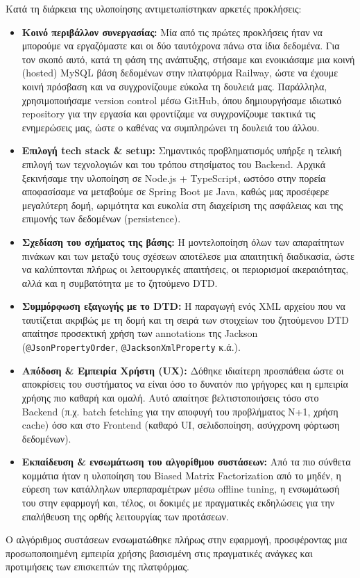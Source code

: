 \documentclass[12pt]{fphw}
\newcommand{\en}[1]{\foreignlanguage{english}{#1}}
\begin{document}
Κατά τη διάρκεια της υλοποίησης αντιμετωπίστηκαν αρκετές προκλήσεις:
\begin{itemize}[label=\textbullet]

\item \textbf{Κοινό περιβάλλον συνεργασίας:} Μία από τις πρώτες προκλήσεις ήταν να μπορούμε να εργαζόμαστε και οι δύο ταυτόχρονα πάνω στα ίδια δεδομένα. Για τον σκοπό αυτό, κατά τη φάση της ανάπτυξης, στήσαμε και ενοικιάσαμε μια κοινή (\en{hosted}) \en{MySQL} βάση δεδομένων στην πλατφόρμα \en{Railway}, ώστε να έχουμε κοινή πρόσβαση και να συγχρονίζουμε εύκολα τη δουλειά μας. Παράλληλα, χρησιμοποιήσαμε \en{version control} μέσω \en{GitHub}, όπου δημιουργήσαμε ιδιωτικό \en{repository} για την εργασία και φροντίζαμε να συγχρονίζουμε τακτικά τις ενημερώσεις μας, ώστε ο καθένας να συμπληρώνει τη δουλειά του άλλου.

\item \textbf{Επιλογή tech stack \& setup:} Σημαντικός προβληματισμός υπήρξε η τελική επιλογή των τεχνολογιών και του τρόπου στησίματος του \en{Backend}. Αρχικά ξεκινήσαμε την υλοποίηση σε \en{Node.js + TypeScript}, ωστόσο στην πορεία αποφασίσαμε να μεταβούμε σε \en{Spring Boot} με \en{Java}, καθώς μας προσέφερε μεγαλύτερη δομή, ωριμότητα και ευκολία στη διαχείριση της ασφάλειας και της επιμονής των δεδομένων (\en{persistence}).

\item \textbf{Σχεδίαση του σχήματος της βάσης:} Η μοντελοποίηση όλων των απαραίτητων πινάκων και των μεταξύ τους σχέσεων αποτέλεσε μια απαιτητική διαδικασία, ώστε να καλύπτονται πλήρως οι λειτουργικές απαιτήσεις, οι περιορισμοί ακεραιότητας, αλλά και η συμβατότητα με το ζητούμενο \en{DTD}.

\item \textbf{Συμμόρφωση εξαγωγής με το \en{DTD}:} Η παραγωγή ενός \en{XML} αρχείου που να ταυτίζεται ακριβώς με τη δομή και τη σειρά των στοιχείων του ζητούμενου \en{DTD} απαίτησε προσεκτική χρήση των \en{annotations} της \en{Jackson} (\en{\texttt{@JsonPropertyOrder}}, \en{\texttt{@JacksonXmlProperty}} κ.ά.).

\item \textbf{Απόδοση \& Εμπειρία Χρήστη (\en{UX}):} Δόθηκε ιδιαίτερη προσπάθεια ώστε οι αποκρίσεις του συστήματος να είναι όσο το δυνατόν πιο γρήγορες και η εμπειρία χρήσης πιο καθαρή και ομαλή. Αυτό απαίτησε βελτιστοποιήσεις τόσο στο \en{Backend} (π.χ. \en{batch fetching} για την αποφυγή του προβλήματος \en{N+1}, χρήση \en{cache}) όσο και στο \en{Frontend} (καθαρό \en{UI}, σελιδοποίηση, ασύγχρονη φόρτωση δεδομένων).

\item \textbf{Εκπαίδευση \& ενσωμάτωση του αλγορίθμου συστάσεων:} Από τα πιο σύνθετα κομμάτια ήταν η υλοποίηση του \en{Biased Matrix Factorization} από το μηδέν, η εύρεση των κατάλληλων υπερπαραμέτρων μέσω \en{offline tuning}, η ενσωμάτωσή του στην εφαρμογή και, τέλος, οι δοκιμές με πραγματικές εκδηλώσεις για την επαλήθευση της ορθής λειτουργίας των προτάσεων.
\end{itemize}

Ο αλγόριθμος συστάσεων ενσωματώθηκε πλήρως στην εφαρμογή, προσφέροντας μια προσωποποιημένη εμπειρία χρήσης βασισμένη στις πραγματικές ανάγκες και προτιμήσεις των επισκεπτών της πλατφόρμας.
\end{document}
